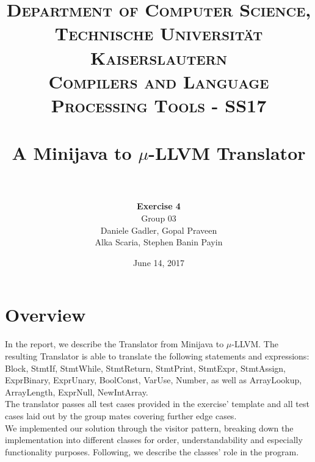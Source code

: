 \documentclass[paper=a4, fontsize=11pt]{scrartcl}
\title{
		\usefont{OT1}{bch}{b}{n}
		\normalfont \normalsize \textsc{Department of Computer Science, Technische Universit\"at Kaiserslautern\\
Compilers and Language Processing Tools - SS17
		} \\ [2pt]
		\horrule{0.5pt} \\[0.4cm]
		\huge A Minijava to $\mu$-LLVM Translator\\
		\horrule{2pt} \\[0.5cm]
}
\author{	
		\textbf{Exercise 4}\\
		Group 03\\
        Daniele Gadler, Gopal Praveen\\Alka Scaria, Stephen Banin Payin \\[-1pt]		\normalsize
}
\date{June 14, 2017}
\numberwithin{equation}{section}		%
\numberwithin{figure}{section}			%
\numberwithin{table}{section}				%
\begin{document}
\maketitle

\section*{Overview}
In the report, we describe the Translator from Minijava to $\mu$-LLVM. The resulting Translator is able to translate the following statements and expressions: Block, StmtIf, StmtWhile, StmtReturn, StmtPrint, StmtExpr, StmtAssign, ExprBinary, ExprUnary, BoolConst, VarUse, Number, as well as ArrayLookup, ArrayLength, ExprNull, NewIntArray. \\
The translator passes all test cases provided in the exercise' template and all test cases laid out by the group mates covering further edge cases. \\
We implemented our solution through the visitor pattern, breaking down the implementation into different classes for order, understandability and especially functionality purposes. Following, we describe the classes' role in the program. 
\end{document}
